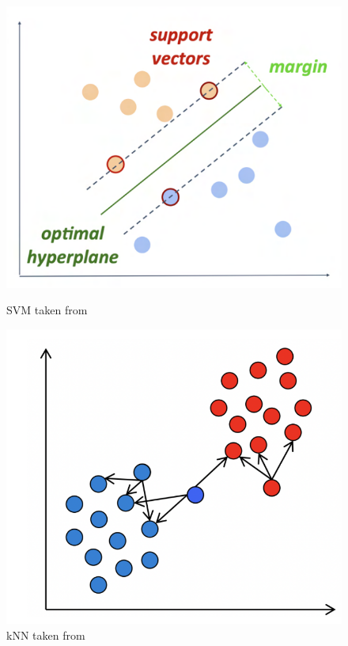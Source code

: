     \begin{figure}[!htbp]
        \centering
        \begin{minipage}[b]{0.45\columnwidth}
            \includegraphics[width=\textwidth]{images/svm.png}
            \caption{SVM taken from \parencite{ml}}
            \label{fig:ur10}
        \end{minipage}
        \begin{minipage}[b]{0.45\columnwidth}
            \includegraphics[width=\textwidth]{images/knn.png}
            \caption{kNN taken from \parencite{ml}} 
            \label{fig:reduced}
        \end{minipage}
    \end{figure}
    




